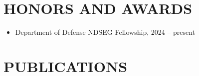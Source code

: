 \documentclass[]{res}
\begin{document}
\begin{resume}




\section{HONORS AND AWARDS}
\begin{itemize}[leftmargin=0mm]
\item[]Department of Defense NDSEG Fellowship, 2024 -- present
\end{itemize}


\section{PUBLICATIONS}
\vspace{2mm}
 



\end{resume}
\end{document}
